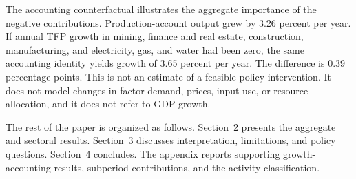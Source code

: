 The accounting counterfactual illustrates the aggregate importance of the negative contributions. Production-account output grew by 3.26 percent per year. If annual TFP growth in mining, finance and real estate, construction, manufacturing, and electricity, gas, and water had been zero, the same accounting identity yields growth of 3.65 percent per year. The difference is 0.39 percentage points. This is not an estimate of a feasible policy intervention. It does not model changes in factor demand, prices, input use, or resource allocation, and it does not refer to GDP growth.

The rest of the paper is organized as follows. Section~2 presents the aggregate and sectoral results. Section~3 discusses interpretation, limitations, and policy questions. Section~4 concludes. The appendix reports supporting growth-accounting results, subperiod contributions, and the activity classification.
